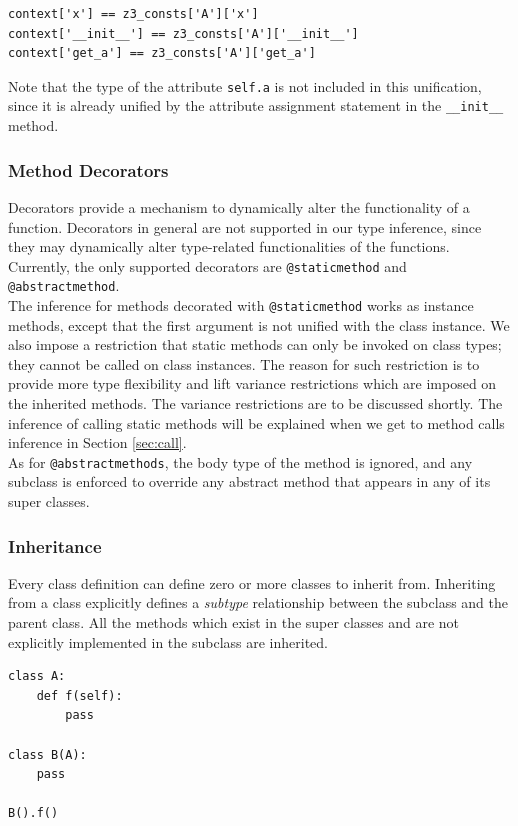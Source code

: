 \begin{lstlisting}
context['x'] == z3_consts['A']['x']
context['__init__'] == z3_consts['A']['__init__']
context['get_a'] == z3_consts['A']['get_a']
\end{lstlisting}
Note that the type of the attribute \lstinline|self.a| is not included in this unification, since it is already unified by the attribute assignment statement in the \lstinline|__init__| method.

\subsubsection{Method Decorators}
Decorators provide a mechanism to dynamically alter the functionality of a function. Decorators in general are not supported in our type inference, since they may dynamically alter type-related functionalities of the functions. Currently, the only supported decorators are \lstinline|@staticmethod| and \lstinline|@abstractmethod|. \\

The inference for methods decorated with \lstinline|@staticmethod| works as instance methods, except that the first argument is not unified with the class instance. We also impose a restriction that static methods can only be invoked on class types; they cannot be called on class instances. The reason for such restriction is to provide more type flexibility and lift variance restrictions which are imposed on the inherited methods. The variance restrictions are to be discussed shortly. The inference of calling static methods will be explained when we get to method calls inference in Section \ref{sec:call}. \\

As for \lstinline|@abstractmethods|, the body type of the method is ignored, and any subclass is enforced to override any abstract method that appears in any of its super classes.

\subsubsection{Inheritance}
Every class definition can define zero or more classes to inherit from. Inheriting from a class explicitly defines a \textit{subtype} relationship between the subclass and the parent class. All the methods which exist in the super classes and are not explicitly implemented in the subclass are inherited.
\begin{lstlisting}
class A:
	def f(self):
		pass

class B(A):
	pass
	
B().f()
\end{lstlisting}

